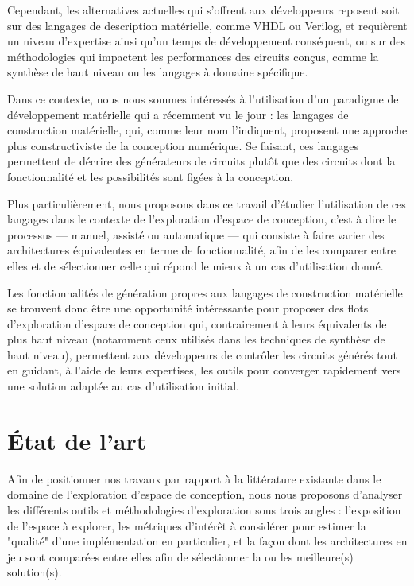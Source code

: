     Cependant, les alternatives actuelles qui s'offrent aux développeurs reposent soit sur des langages de description matérielle, comme VHDL ou Verilog, et requièrent un niveau d'expertise ainsi qu'un temps de développement conséquent, ou sur des méthodologies qui impactent les performances des circuits conçus, comme la synthèse de haut niveau ou les langages à domaine spécifique.

    Dans ce contexte, nous nous sommes intéressés à l'utilisation d'un paradigme de développement matérielle qui a récemment vu le jour : les langages de construction matérielle, qui, comme leur nom l'indiquent, proposent une approche plus constructiviste de la conception numérique.
    Se faisant, ces langages permettent de décrire des générateurs de circuits plutôt que des circuits dont la fonctionnalité et les possibilités sont figées à la conception.

    Plus particulièrement, nous proposons dans ce travail d'étudier l'utilisation de ces langages dans le contexte de l'exploration d'espace de conception, c'est à dire le processus --- manuel, assisté ou automatique --- qui consiste à faire varier des architectures équivalentes en terme de fonctionnalité, afin de les comparer entre elles et de sélectionner celle qui répond le mieux à un cas d'utilisation donné.

    Les fonctionnalités de génération propres aux langages de construction matérielle se trouvent donc être une opportunité intéressante pour proposer des flots d'exploration d'espace de conception qui, contrairement à leurs équivalents de plus haut niveau (notamment ceux utilisés dans les techniques de synthèse de haut niveau), permettent aux développeurs de contrôler les circuits générés tout en guidant, à l'aide de leurs expertises, les outils pour converger rapidement vers une solution adaptée au cas d'utilisation initial.

\section{État de l'art}
\label{ch.resume:sec.state}
    Afin de positionner nos travaux par rapport à la littérature existante dans le domaine de l'exploration d'espace de conception, nous nous proposons d'analyser les différents outils et méthodologies d'exploration sous trois angles : l'exposition de l'espace à explorer, les métriques d'intérêt à considérer pour estimer la "qualité" d'une implémentation en particulier, et la façon dont les architectures en jeu sont comparées entre elles afin de sélectionner la ou les meilleure(s) solution(s).

